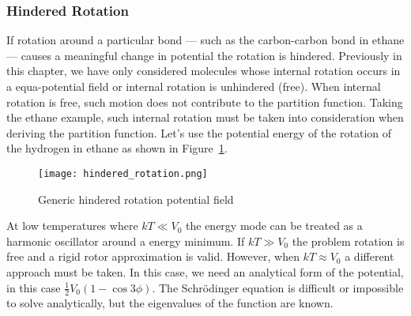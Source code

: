 \subsubsection{Hindered Rotation}
If rotation around a particular bond --- such as the carbon-carbon bond in
ethane --- causes a meaningful change in potential the rotation is hindered.
Previously in this chapter, we have only considered molecules whose internal
rotation occurs in a equa-potential field or internal rotation is unhindered
(free). When internal rotation is free, such motion does not contribute to the
partition function. Taking the ethane example, such internal rotation must be
taken into consideration when deriving the partition function. Let's use the
potential energy of the rotation of the hydrogen in ethane as shown in
Figure~\ref{fig:polyhinderedrotation}.
\begin{figure}[htpb]
	\centering
	\texttt{[image: hindered\_rotation.png]}
	\caption{Generic hindered rotation potential field}%
	\label{fig:polyhinderedrotation}
\end{figure}

At low temperatures where $kT \ll V_0$ the energy mode can be treated as a
harmonic oscillator around a energy minimum. If $kT \gg V_0$ the problem
rotation is free and a rigid rotor approximation is valid. However, when $kT
\approx V_0$ a different approach must be taken. In this case, we need an
analytical form of the potential, in this case $\frac{1}{2} V_0 (1 -
\cos{3\phi})$. The Schrödinger equation is difficult or impossible to solve
analytically, but the eigenvalues of the function are known.

